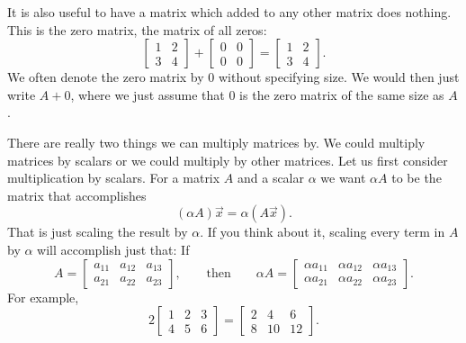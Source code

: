 It is also useful to have a matrix which added to any other matrix
does nothing.  This is the zero matrix, the matrix of all zeros:
\begin{equation*}
\begin{bmatrix}
1 & 2 \\
3 & 4
\end{bmatrix}
+
\begin{bmatrix}
0 & 0 \\
0 & 0
\end{bmatrix}
=
\begin{bmatrix}
1 & 2 \\
3 & 4
\end{bmatrix} .
\end{equation*}
We often denote the zero matrix
by $0$ without specifying size.  We would then just write $A + 0$, where we
just assume that $0$ is the zero matrix of the same size as $A$.

\medskip

There are really two things we can multiply matrices by.  We could multiply
matrices by scalars or we could multiply by other matrices.  Let us first
consider multiplication by scalars.
For a matrix $A$ and a scalar $\alpha$ we want $\alpha A$ to be the matrix
that accomplishes
\begin{equation*}
(\alpha A) \vec{x} = \alpha (A \vec{x}) .
\end{equation*}
That is just scaling the result by $\alpha$.  If you think about it,
scaling every term in $A$ by $\alpha$ will accomplish just that:
If
\begin{equation*}
A = 
\begin{bmatrix}
a_{11} & a_{12} & a_{13}  \\
a_{21} & a_{22} & a_{23}
\end{bmatrix},
\qquad\text{then} \qquad
\alpha A = 
\begin{bmatrix}
\alpha a_{11} & \alpha a_{12} & \alpha a_{13}  \\
\alpha a_{21} & \alpha a_{22} & \alpha a_{23}
\end{bmatrix} .
\end{equation*}
For example,
\begin{equation*}
2
\begin{bmatrix}
1 & 2 & 3 \\
4 & 5 & 6
\end{bmatrix} =
\begin{bmatrix}
2 & 4 & 6 \\
8 & 10 & 12
\end{bmatrix} .
\end{equation*}

